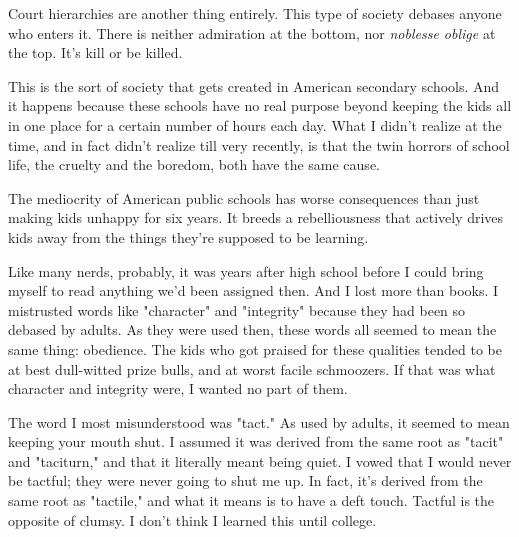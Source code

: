 Court
                  hierarchies are another thing entirely. This type of society
                  debases anyone who enters it. There is neither admiration at
                  the bottom, nor \emph{noblesse oblige} at the top. It's kill
                  or be killed.

This is the sort of society that gets
                  created in American secondary schools. And it happens because
                  these schools have no real purpose beyond keeping the kids all
                  in one place for a certain number of hours each day. What I
                  didn't realize at the time, and in fact didn't realize till
                  very recently, is that the twin horrors of school life, the
                  cruelty and the boredom, both have the same cause.




                  The mediocrity of American public schools has worse
                  consequences than just making kids unhappy for six years. It
                  breeds a rebelliousness that actively drives kids away from
                  the things they're supposed to be learning.

Like
                  many nerds, probably, it was years after high school before I
                  could bring myself to read anything we'd been assigned then.
                  And I lost more than books. I mistrusted words like
                  "character" and "integrity" because they had been so debased
                  by adults. As they were used then, these words all seemed to
                  mean the same thing: obedience. The kids who got praised for
                  these qualities tended to be at best dull-witted prize bulls,
                  and at worst facile schmoozers. If that was what character and
                  integrity were, I wanted no part of them.

The word
                  I most misunderstood was "tact." As used by adults, it seemed
                  to mean keeping your mouth shut. I assumed it was derived from
                  the same root as "tacit" and "taciturn," and that it literally
                  meant being quiet. I vowed that I would never be tactful; they
                  were never going to shut me up. In fact, it's derived from the
                  same root as "tactile," and what it means is to have a deft
                  touch. Tactful is the opposite of clumsy. I don't think I
                  learned this until college.



